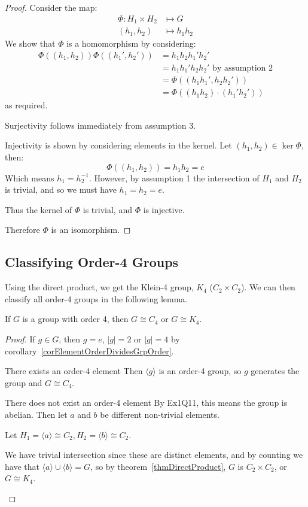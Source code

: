 \documentclass[../Main.tex]{subfiles}
\begin{document}
\begin{proof}
    Consider the map:
    \begin{align*}
        \Phi : H_1 \times H_2 &\mapsto G \\
        (h_1, h_2) &\mapsto h_1 h_2
    \end{align*}
    We show that $\Phi$ is a homomorphism by considering:
    \begin{align*}
        \Phi((h_1, h_2))\Phi((h_1', h_2')) &= h_1 h_2 h_1' h_2' \\
        &= h_1 h_1' h_2 h_2' \text{ by assumption 2} \\
        &= \Phi((h_1 h_1', h_2 h_2')) \\
        &= \Phi((h_1 h_2) \cdot (h_1' h_2'))
    \end{align*}
    as required.\par
    Surjectivity follows immediately from assumption 3.\par
    Injectivity is shown by considering elements in the kernel. Let $(h_1, h_2) \in \ker{\Phi}$, then:
    \begin{equation*}
        \Phi((h_1, h_2)) = h_1 h_2 = e
    \end{equation*}
    Which means $h_1 = h_2^{-1}$. However, by assumption 1 the intersection of $H_1$ and $H_2$ is trivial, and so we must have $h_1 = h_2 = e$.\par
    Thus the kernel of $\Phi$ is trivial, and $\Phi$ is injective.\par
    Therefore $\Phi$ is an isomorphism.
\end{proof}
\subsection{Classifying Order-4 Groups}
Using the direct product, we get the Klein-4 group, $K_4$ ($C_2 \times C_2$). We can then classify all order-4 groups in the following lemma.
\begin{lemma}
    If $G$ is a group with order 4, then $G \cong C_4$ or $G \cong K_4$.
    \label{lemOrder4Groups}
\end{lemma}
\begin{proof}
    If $g \in G$, then $g = e$, $|g| = 2$ or $|g| = 4$ by corollary~\ref{corElementOrderDividesGrpOrder}.
    \begin{case}{There exists an order-4 element}
        Then $\langle g \rangle$ is an order-4 group, so $g$ generates the group and $G \cong C_4$.
    \end{case}
    \begin{case}{There does not exist an order-4 element}
        By Ex1Q11, this means the group is abelian. Then let $a$ and $b$ be different non-trivial elements.\par
        Let $H_1 = \langle a \rangle \cong C_2, H_2 = \langle b \rangle \cong C_2$.\par
        We have trivial intersection since these are distinct elements, and by counting we have that $\langle a \rangle \cup \langle b \rangle = G$, so by theorem~\ref{thmDirectProduct}, $G$ is $C_2 \times C_2$, or $G \cong K_4$.
    \end{case}
\end{proof}
\end{document}
